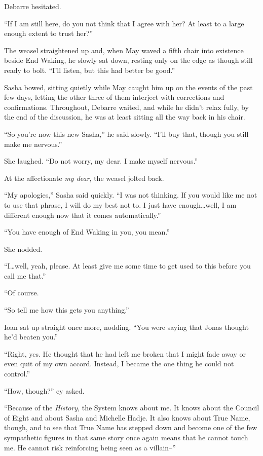 Debarre hesitated.

``If I am still here, do you not think that I agree with her? At least to a large enough extent to trust her?''

The weasel straightened up and, when May waved a fifth chair into existence beside End Waking, he slowly sat down, resting only on the edge as though still ready to bolt. ``I'll listen, but this had better be good.''

Sasha bowed, sitting quietly while May caught him up on the events of the past few days, letting the other three of them interject with corrections and confirmations. Throughout, Debarre waited, and while he didn't relax fully, by the end of the discussion, he was at least sitting all the way back in his chair.

``So you're now this new Sasha,'' he said slowly. ``I'll buy that, though you still make me nervous.''

She laughed. ``Do not worry, my dear. I make myself nervous.''

At the affectionate \emph{my dear}, the weasel jolted back.

``My apologies,'' Sasha said quickly. ``I was not thinking. If you would like me not to use that phrase, I will do my best not to. I just have enough\ldots well, I am different enough now that it comes automatically.''

``You have enough of End Waking in you, you mean.''

She nodded.

``I\ldots well, yeah, please. At least give me some time to get used to this before you call me that.''

``Of course.

``So tell me how this gets you anything.''

Ioan sat up straight once more, nodding. ``You were saying that Jonas thought he'd beaten you.''

``Right, yes. He thought that he had left me broken that I might fade away or even quit of my own accord. Instead, I became the one thing he could not control.''

``How, though?'' ey asked.

``Because of the \emph{History}, the System knows about me. It knows about the Council of Eight and about Sasha and Michelle Hadje. It also knows about True Name, though, and to see that True Name has stepped down and become one of the few sympathetic figures in that same story once again means that he cannot touch me. He cannot risk reinforcing being seen as a villain--''

